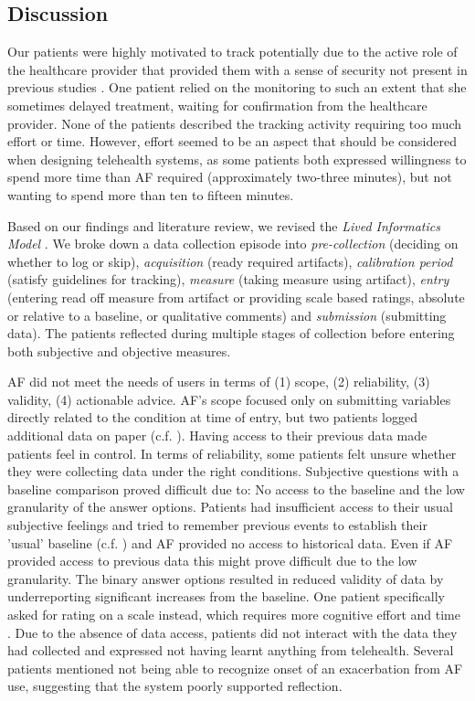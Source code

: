 \subsection{Discussion}
Our patients were highly motivated to track potentially due to the active role of the healthcare provider that provided them with a sense of security not present in previous studies \cite{Li2010, Ancker2015, Chung2015}. One patient relied on the monitoring to such an extent that she sometimes delayed treatment, waiting for confirmation from the healthcare provider. None of the patients described the tracking activity requiring too much effort or time. However, effort seemed to be an aspect that should be considered when designing telehealth systems, as some patients both expressed willingness to spend more time than AF required (approximately two-three minutes), but not wanting to spend more than ten to fifteen minutes.

Based on our findings and literature review, we revised the \textit{Lived Informatics Model} \cite{Epstein2015}. We broke down a data collection episode into \textit{pre-collection} (deciding on whether to log or skip), \textit{acquisition} (ready required artifacts), \textit{calibration period} (satisfy guidelines for tracking), \textit{measure} (taking measure using artifact), \textit{entry} (entering read off measure from artifact or providing scale based ratings, absolute or relative to a baseline, or qualitative comments) and \textit{submission} (submitting data). The patients reflected during multiple stages of collection before entering both subjective and objective measures. 

AF did not meet the needs of users in terms of (1) scope, (2) reliability, (3) validity, (4) actionable advice. AF's scope focused only on submitting variables directly related to the condition at time of entry, but two patients logged additional data on paper (c.f. \cite{Patel2012, Chung2016}). Having access to their previous data made patients feel in control. In terms of reliability, some patients felt unsure whether they were collecting data under the right conditions. Subjective questions with a baseline comparison proved difficult due to: No access to the baseline and the low granularity of the answer options. Patients had insufficient access to their usual subjective feelings and tried to remember previous events to establish their 'usual' baseline (c.f. \cite{piloting}) and AF provided no access to historical data. Even if AF provided access to previous data this might prove difficult due to the low granularity. The binary answer options resulted in reduced validity of data by underreporting significant increases from the baseline. One patient specifically asked for rating on a scale instead, which requires more cognitive effort and time \cite{Oh2015}. Due to the absence of data access, patients did not interact with the data they had collected and expressed not having learnt anything from telehealth. Several patients mentioned not being able to recognize onset of an exacerbation from AF use, suggesting that the system poorly supported reflection. 

